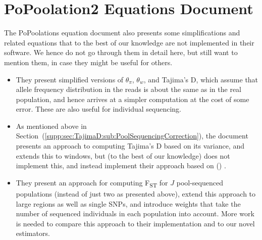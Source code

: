 \documentclass[a4paper,9pt,DIV=14]{scrartcl}
\newcounter{todo}
\newcommand\todo[1]{}
\newcommand\toolname{\textsc}
\newcommand\secref[1]{Section~(\ref{#1})}
\newcommand{\fst}{F\textsubscript{ST}}
\newcommand\citeay[1]{\citeauthor{#1} (\citeyear{#1}) \cite{#1}}
\begin{document}




\todo{(Moi) I think is fine to just say this and not go through equations ;) }

\section{PoPoolation2 Equations Document}
\label{supp:sec:PoPoolation2Equations}

The PoPoolations equation document also presents some simplifications and related equations that to the best of our knowledge are not implemented in their software.
We hence do not go through them in detail here, but still want to mention them, in case they might be useful for others.

\begin{itemize}
  \item They present simplified versions of $\theta_\pi$, $\theta_w$, and Tajima's D, which assume that allele frequency distribution in the reads is about the same as in the real population, and hence arrives at a simpler computation at the cost of some error. These are also useful for individual sequencing.
  \item As mentioned above in \secref{supp:sec:TajimaD:sub:PoolSequencingCorrection}, the document presents an approach to computing Tajima's D based on its variance, and extends this to windows, but (to the best of our knowledge) does not implement this, and instead implement their approach based on \citeay{Achaz2008}.
  \item They present an approach for computing \fst{} for $J$ pool-sequenced populations (instead of just two as presented above), extend this approach to large regions as well as single SNPs, and introduce weights that take the number of sequenced individuals in each population into account. More work is needed to compare this approach to their implementation and to our novel estimators.
\end{itemize}
\end{document}
